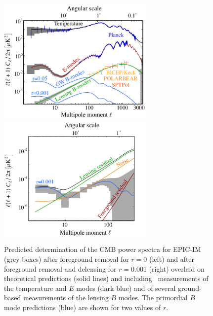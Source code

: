 \begin{figure}[t]
\vspace{-0.15in}
\begin{center}
\includegraphics[width=3in]{figs/cmb_powspec_v1.pdf}  
\includegraphics[width=3in]{figs/cmbbb_powspec_v1.pdf}
\end{center}
\vspace{-0.3in}
\caption{ \small \setlength{\baselineskip}{0.95\baselineskip}
Predicted determination of the \ac{CMB} power spectra for EPIC-IM (grey boxes) after foreground removal for $r=0$ (left) and after foreground removal and delensing for $r=0.001$ (right) overlaid on theoretical predictions (solid lines) and including \planck\ measurements of the temperature and $E$ modes (dark blue) and of several ground-based measurements of the lensing $B$ modes.  The primordial $B$ mode predictions (blue) are shown for two values of $r$. 
\label{fig:clall} }
\vspace{-0.05in}
\end{figure}



